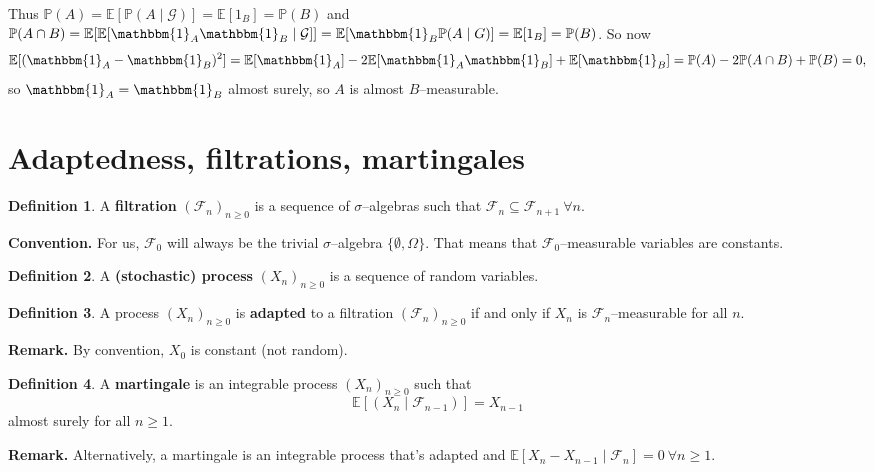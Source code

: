 \documentclass{article}
\theoremstyle{definition}
\newtheorem{defn}{Definition}[section]
\begin{document}
Thus $\mathbb{P}(A)= \mathbb{E}[\mathbb{P}(A \mid \mathcal{G})] = \mathbb{E}[1_B]=\mathbb{P}(B)$ and $\mathbb{P}(A \cap B) = \mathbb{E}[\mathbb{E}[\mathbbm{1}_A \mathbbm{1}_B \mid \mathcal{G}]] = \mathbb{E}[\mathbbm{1}_B \mathbb{P}(A \mid G)] = \mathbb{E}[1_B] = \mathbb{P}(B)$. So now 
\[
\mathbb{E}[(\mathbbm{1}_A - \mathbbm{1}_B)^2] = \mathbb{E}[\mathbbm{1}_A] - 2\mathbb{E}[\mathbbm{1}_A \mathbbm{1}_B] + \mathbb{E}[\mathbbm{1}_B] = \mathbb{P}(A) - 2 \mathbb{P}(A \cap B) + \mathbb{P}(B) = 0,
\]
so $\mathbbm{1}_A = \mathbbm{1}_B$ almost surely, so $A$ is almost $B$--measurable.

\section{Adaptedness, filtrations, martingales}

\begin{defn}
    A \textbf{filtration} $(\mathcal{F}_n)_{n\ge 0}$ is a sequence of $\sigma$--algebras such that $\mathcal{F}_n \subseteq \mathcal{F}_{n+1} ~\forall n$.
\end{defn}
\textbf{Convention.} For us, $\mathcal{F}_0$ will always be the trivial $\sigma$--algebra $\{\emptyset, \Omega\}$. That means that $\mathcal{F}_0$--measurable variables are constants.

\begin{defn}
    A \textbf{(stochastic) process} $(X_n)_{n\ge 0}$ is a sequence of random variables.
\end{defn}
\begin{defn}
    A process $(X_n)_{n\ge 0}$ is \textbf{adapted} to a filtration $(\mathcal{F}_n)_{n\ge 0}$ if and only if $X_n$ is $\mathcal{F}_n$--measurable for all $n$.
\end{defn}
\textbf{Remark.} By convention, $X_0$ is constant (not random).

\begin{defn}
    A \textbf{martingale} is an integrable process $(X_n)_{n\ge 0}$ such that $$\mathbb{E}[(X_n \mid \mathcal{F}_{n-1})] = X_{n-1}$$ almost surely for all $n\ge 1$.
\end{defn}
\textbf{Remark.} Alternatively, a martingale is an integrable process that's adapted and $\mathbb{E}[X_n - X_{n-1} \mid \mathcal{F}_n] = 0 ~\forall n\ge 1$.
\end{document}
